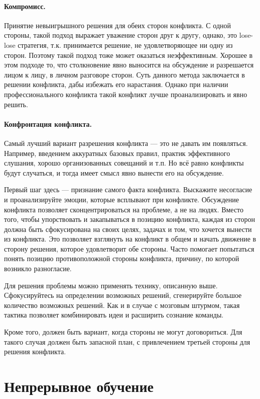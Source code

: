 \documentclass{../../text-style}
\begin{document}
\paragraph*{Компромисс.} Принятие невыигрышного решения для обеих сторон конфликта. С одной стороны, такой подход выражает уважение сторон друг к другу, однако, это lose-lose стратегия, т.к. принимается решение, не удовлетворяющее ни одну из сторон. Поэтому такой подход тоже может оказаться неэффективным. Хорошее в этом подходе то, что столкновение явно выносится на обсуждение и разрешается лицом к лицу, в личном разговоре сторон. Суть данного метода заключается в решении конфликта, дабы избежать его нарастания. Однако при наличии профессионального конфликта такой конфликт лучше проанализировать и явно решить.

\paragraph*{Конфронтация конфликта.} Самый лучший вариант разрешения конфликта --- это не давать им появляться. Например, введением аккуратных базовых правил, практик эффективного слушания, хорошо организованных совещаний и т.п. Но всё равно конфликты будут случаться, и тогда имеет смысл явно вынести его на обсуждение.

Первый шаг здесь --- признание самого факта конфликта. Выскажите несогласие и проанализируйте эмоции, которые всплывают при конфликте. Обсуждение конфликта позволяет сконцентрироваться на проблеме, а не на людях. Вместо того, чтобы упорствовать и закапываться в позицию конфликта, каждая из сторон должна быть сфокусирована на своих целях, задачах и том, что хочется вынести из конфликта. Это позволяет взглянуть на конфликт в общем и начать движение в сторону решения, которое удовлетворит обе стороны. Часто помогает попытаться понять позицию противоположной стороны конфликта, причину, по которой возникло разногласие.

Для решения проблемы можно применять технику, описанную выше. Сфокусируйтесь на определении возможных решений, сгенерируйте большое количество возможных решений. Как и в случае с мозговым штурмом, такая тактика позволяет комбинировать идеи и расширить сознание команды.

Кроме того, должен быть вариант, когда стороны не могут договориться. Для такого случая должен быть запасной план, с привлечением третьей стороны для решения конфликта.

\section{Непрерывное обучение}
\end{document}
